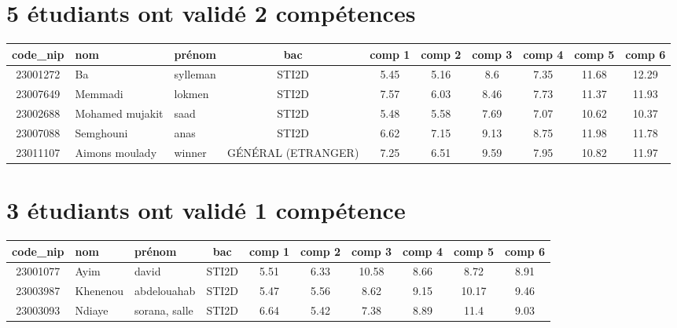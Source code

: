 \documentclass{article}%
\begin{document}
%
\section*{5 étudiants ont validé 2 compétences}%
\label{sec:5tudiantsontvalid2comptences}%
\begin{tabular}{|c|l|l|c|c|c|c|c|c|c|}%
\hline%
\rowcolor{jaune}%
code\_nip&nom&prénom&bac&comp 1&comp 2&comp 3&comp 4&comp 5&comp 6\\%
\hline%
23001272&Ba&sylleman&STI2D&5.45&5.16&8.6&7.35&11.68&12.29\\%
\hline%
23007649&Memmadi&lokmen&STI2D&7.57&6.03&8.46&7.73&11.37&11.93\\%
\hline%
23002688&Mohamed mujakit&saad&STI2D&5.48&5.58&7.69&7.07&10.62&10.37\\%
\hline%
23007088&Semghouni&anas&STI2D&6.62&7.15&9.13&8.75&11.98&11.78\\%
\hline%
23011107&Aimons moulady&winner&GÉNÉRAL (ETRANGER)&7.25&6.51&9.59&7.95&10.82&11.97\\%
\hline%
\end{tabular}

%
\section*{3 étudiants ont validé 1 compétence}%
\label{sec:3tudiantsontvalid1comptence}%
\begin{tabular}{|c|l|l|c|c|c|c|c|c|c|}%
\hline%
\rowcolor{jaune}%
code\_nip&nom&prénom&bac&comp 1&comp 2&comp 3&comp 4&comp 5&comp 6\\%
\hline%
23001077&Ayim&david&STI2D&5.51&6.33&10.58&8.66&8.72&8.91\\%
\hline%
23003987&Khenenou&abdelouahab&STI2D&5.47&5.56&8.62&9.15&10.17&9.46\\%
\hline%
23003093&Ndiaye&sorana, salle&STI2D&6.64&5.42&7.38&8.89&11.4&9.03\\%
\hline%
\end{tabular}

%
\end{document}
